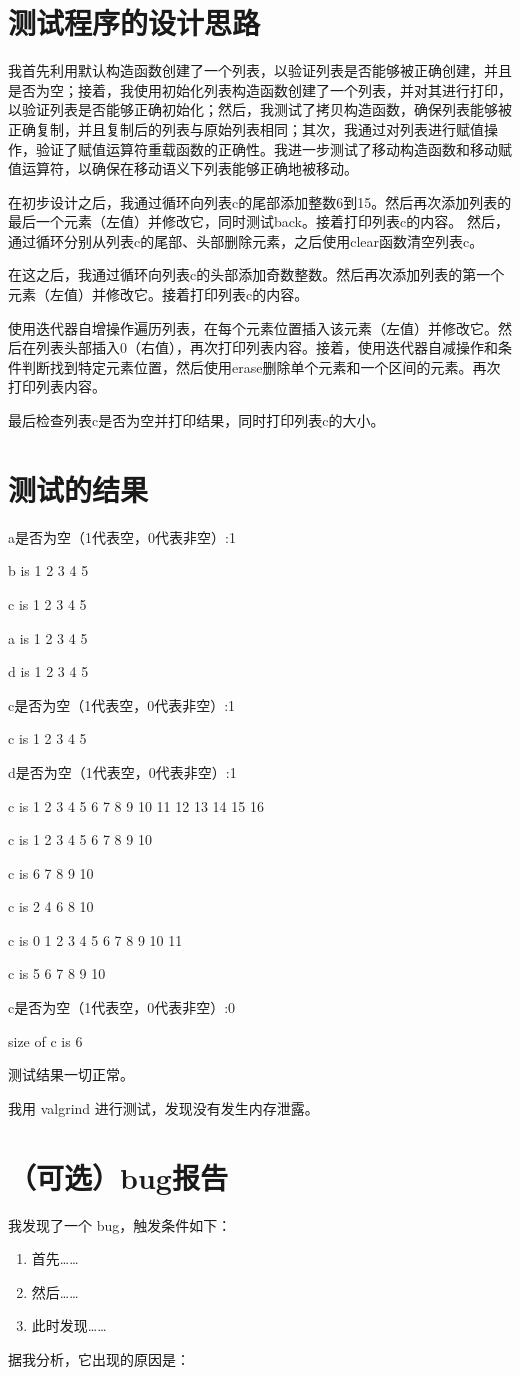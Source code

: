 \documentclass[UTF8]{ctexart}
\begin{document}
\pagestyle{fancy}
\fancyhead{}

\section{测试程序的设计思路}

我首先利用默认构造函数创建了一个列表，以验证列表是否能够被正确创建，并且是否为空；接着，我使用初始化列表构造函数创建了一个列表，并对其进行打印，以验证列表是否能够正确初始化；然后，我测试了拷贝构造函数，确保列表能够被正确复制，并且复制后的列表与原始列表相同；其次，我通过对列表进行赋值操作，验证了赋值运算符重载函数的正确性。我进一步测试了移动构造函数和移动赋值运算符，以确保在移动语义下列表能够正确地被移动。

在初步设计之后，我通过循环向列表c的尾部添加整数6到15。然后再次添加列表的最后一个元素（左值）并修改它，同时测试back。接着打印列表c的内容。
然后，通过循环分别从列表c的尾部、头部删除元素，之后使用clear函数清空列表c。

在这之后，我通过循环向列表c的头部添加奇数整数。然后再次添加列表的第一个元素（左值）并修改它。接着打印列表c的内容。

使用迭代器自增操作遍历列表，在每个元素位置插入该元素（左值）并修改它。然后在列表头部插入0（右值），再次打印列表内容。接着，使用迭代器自减操作和条件判断找到特定元素位置，然后使用erase删除单个元素和一个区间的元素。再次打印列表内容。

最后检查列表c是否为空并打印结果，同时打印列表c的大小。

\section{测试的结果}

a是否为空（1代表空，0代表非空）:1

b is 1 2 3 4 5

c is 1 2 3 4 5

a is 1 2 3 4 5

d is 1 2 3 4 5

c是否为空（1代表空，0代表非空）:1

c is 1 2 3 4 5

d是否为空（1代表空，0代表非空）:1

c is 1 2 3 4 5 6 7 8 9 10 11 12 13 14 15 16

c is 1 2 3 4 5 6 7 8 9 10

c is 6 7 8 9 10

c is 2 4 6 8 10

c is 0 1 2 3 4 5 6 7 8 9 10 11

c is 5 6 7 8 9 10

c是否为空（1代表空，0代表非空）:0

size of c is 6

测试结果一切正常。

我用 valgrind 进行测试，发现没有发生内存泄露。

\section{（可选）bug报告}

我发现了一个 bug，触发条件如下：

\begin{enumerate}
    \item 首先……
    \item 然后……
    \item 此时发现……
\end{enumerate}

据我分析，它出现的原因是：
\end{document}
